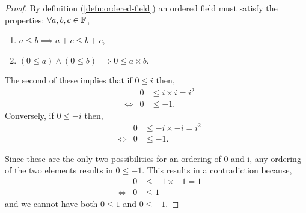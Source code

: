 \documentclass[../MathsNotesBase.tex]{subfiles}
\begin{document}
{		\bigskip
		\begin{proof}
			By definition (\ref{defn:ordered-field}) an ordered field must satisfy the properties:
			${ \forall a,b,c \in \mathbb{F}^{} }$,
			\begin{enumerate}[label=(\roman*)]
				\item{${ a \leq b \implies a + c \leq b + c }$,}
				\item{${ (0 \leq a) \land (0 \leq b) \implies 0 \leq a \times b  }$.}
			\end{enumerate}
			The second of these implies that if ${ 0 \leq i }$ then,
			\[\begin{aligned}
				&& 0 &\leq i \times i = i^2  \\
				&\iff & 0 &\leq -1.
			\end{aligned}\]
			Conversely, if ${ 0 \leq -i }$ then,
			\[\begin{aligned}
				&& 0 &\leq -i \times -i = i^2  \\
				&\iff & 0 &\leq -1.
			\end{aligned}\]
			
			Since these are the only two possibilities for an ordering of 0 and i, any ordering of the two elements results in ${ 0 \leq -1 }$. This results in a contradiction because,
			\[\begin{aligned}
				&& 0 &\leq -1 \times -1 = 1  \\
				&\iff & 0 &\leq 1
			\end{aligned}\]
			and we cannot have both ${ 0 \leq 1 }$ and ${ 0 \leq -1 }$.
		\end{proof}
	
		\biggerskip
}
\end{document}
